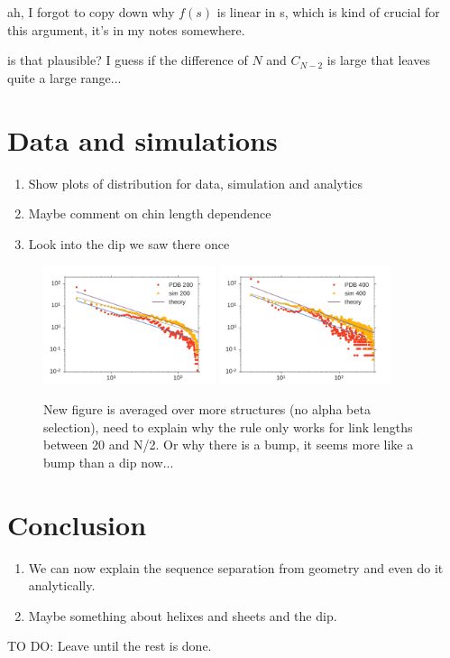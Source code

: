 \documentclass[reprint,amsmath,amssymb,rmp,onecolumn,notitlepage,11pt]{revtex4-1}
\newcommand{\red}[1]{\textcolor{red!80!black}{#1}}
\begin{document}
\red{ah, I forgot to copy down why $f(s)$ is linear in s, which is kind of crucial for this argument, it's in my notes somewhere.}

\red{is that plausible? I guess if the difference of $N$ and $C_{N-2}$ is large that leaves quite a large range...}

\section*{Data and simulations}
\begin{enumerate}
    \item Show plots of distribution for data, simulation and analytics
    \item Maybe comment on chin length dependence
    \item Look into the dip we saw there once
\end{enumerate}
\begin{figure}[h]
        \centering
	\includegraphics[width=0.45\textwidth]{figures/both_dist_200.pdf}
	\includegraphics[width=0.45\textwidth]{figures/both_dist_400.pdf}
        \caption{New figure is averaged over more structures (no alpha beta selection), need to explain why the rule only works for link lengths between 20 and N/2. Or why there is a bump, it seems more like a bump than a dip now...
        }
        \label{fig:time_scaling}
\end{figure}
\section*{Conclusion}
\begin{enumerate}
    \item We can now explain the sequence separation from geometry and even do it analytically.
    \item Maybe something about helixes and sheets and the dip.
\end{enumerate}
TO DO: Leave until the rest is done.
\end{document}
